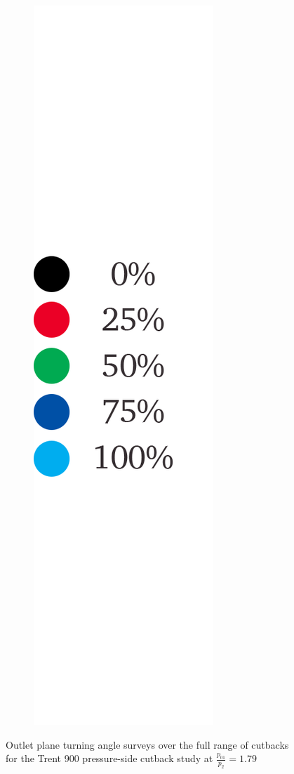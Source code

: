 \documentclass[a4paper, 11pt, oneside]{report}
\begin{document}
\begin{figure}[H]
\begin{subfigure}{.1125\textwidth}
		\includegraphics[width=\linewidth]{figs/ps_cutbacks_turning_angles_survey_legend.png}
	\end{subfigure}
	\caption{Outlet plane turning angle surveys over the full range of cutbacks for the Trent 900 pressure-side cutback study at $\frac{p_{01}}{p_2}=1.79$}
      \label{fig:ps_cutbacks_turning_angle_surveys}
\end{figure}
\end{document}
